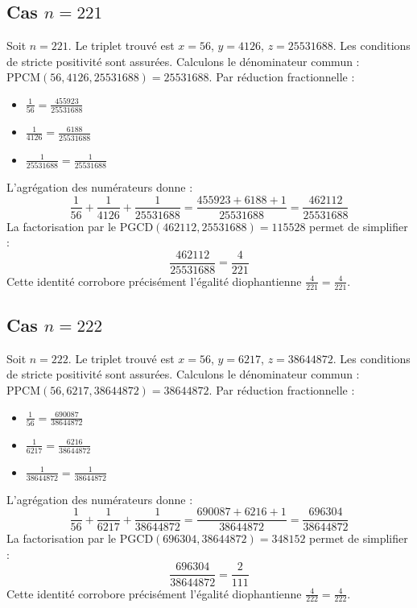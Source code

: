 \documentclass[11pt,a4paper]{article}
\begin{document}
\subsection{Cas $n = 221$}
Soit $n = 221$. Le triplet trouvé est $x = 56$, $y = 4126$, $z = 25531688$.
Les conditions de stricte positivité sont assurées.
Calculons le dénominateur commun : $\text{PPCM}(56, 4126, 25531688) = 25531688$.
Par réduction fractionnelle :
\begin{itemize}
    \item $\frac{1}{56} = \frac{455923}{25531688}$
    \item $\frac{1}{4126} = \frac{6188}{25531688}$
    \item $\frac{1}{25531688} = \frac{1}{25531688}$
\end{itemize}
L'agrégation des numérateurs donne :
$$ \frac{1}{56} + \frac{1}{4126} + \frac{1}{25531688} = \frac{455923 + 6188 + 1}{25531688} = \frac{462112}{25531688} $$
La factorisation par le $\text{PGCD}(462112, 25531688) = 115528$ permet de simplifier :
$$ \frac{462112}{25531688} = \frac{4}{221} $$
Cette identité corrobore précisément l'égalité diophantienne $\frac{4}{221} = \frac{4}{221}$.

\subsection{Cas $n = 222$}
Soit $n = 222$. Le triplet trouvé est $x = 56$, $y = 6217$, $z = 38644872$.
Les conditions de stricte positivité sont assurées.
Calculons le dénominateur commun : $\text{PPCM}(56, 6217, 38644872) = 38644872$.
Par réduction fractionnelle :
\begin{itemize}
    \item $\frac{1}{56} = \frac{690087}{38644872}$
    \item $\frac{1}{6217} = \frac{6216}{38644872}$
    \item $\frac{1}{38644872} = \frac{1}{38644872}$
\end{itemize}
L'agrégation des numérateurs donne :
$$ \frac{1}{56} + \frac{1}{6217} + \frac{1}{38644872} = \frac{690087 + 6216 + 1}{38644872} = \frac{696304}{38644872} $$
La factorisation par le $\text{PGCD}(696304, 38644872) = 348152$ permet de simplifier :
$$ \frac{696304}{38644872} = \frac{2}{111} $$
Cette identité corrobore précisément l'égalité diophantienne $\frac{4}{222} = \frac{4}{222}$.
\end{document}

